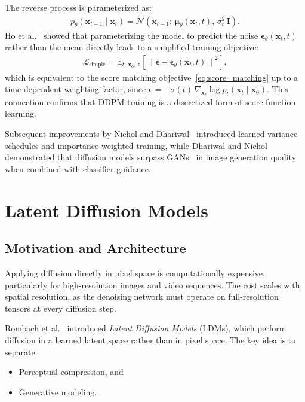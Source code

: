The reverse process is parameterized as:
\begin{align}
    p_\theta(\mathbf{x}_{t-1} \mid \mathbf{x}_t) = \mathcal{N}\!\left(\mathbf{x}_{t-1};\, \boldsymbol{\mu}_\theta(\mathbf{x}_t, t),\, \sigma_t^2\,\mathbf{I}\right).
    \label{eq:reverse}
\end{align}
Ho et al.~\cite{ho2020denoising} showed that parameterizing the model to predict the noise $\boldsymbol{\epsilon}_\theta(\mathbf{x}_t, t)$ rather than the mean directly leads to a simplified training objective:
\begin{align}
    \mathcal{L}_{\text{simple}} = \mathbb{E}_{t,\, \mathbf{x}_0,\, \boldsymbol{\epsilon}}\!\left[\left\|\boldsymbol{\epsilon} - \boldsymbol{\epsilon}_\theta(\mathbf{x}_t, t)\right\|^2\right],
    \label{eq:ddpm_loss}
\end{align}
which is equivalent to the score matching objective~\eqref{eq:score_matching} up to a time-dependent weighting factor, since $\boldsymbol{\epsilon} = -\sigma(t)\,\nabla_{\mathbf{x}_t} \log p_t(\mathbf{x}_t \mid \mathbf{x}_0)$. This connection confirms that DDPM training is a discretized form of score function learning.

Subsequent improvements by Nichol and Dhariwal~\cite{nichol2021improved} introduced learned variance schedules and importance-weighted training, while Dhariwal and Nichol~\cite{dhariwal2021diffusion} demonstrated that diffusion models surpass GANs~\cite{goodfellow2014generative} in image generation quality when combined with classifier guidance.

\section{Latent Diffusion Models}
\label{sec:ldm}

\subsection{Motivation and Architecture}
\label{subsec:ldm_motivation}

Applying diffusion directly in pixel space is computationally expensive, particularly for high-resolution images and video sequences. The cost scales with spatial resolution, as the denoising network must operate on full-resolution tensors at every diffusion step.

Rombach et al.~\cite{rombach2022highresolution} introduced \emph{Latent Diffusion Models} (LDMs), which perform diffusion in a learned latent space rather than in pixel space. The key idea is to separate:
\begin{itemize}
    \item Perceptual compression, and
    \item Generative modeling.
\end{itemize}

